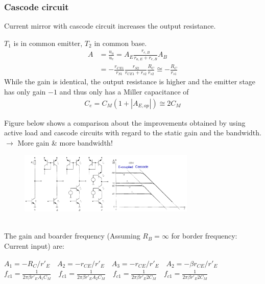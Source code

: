 		\subsubsection{Cascode circuit}
			Current mirror with cascode circuit increases the output resistance. 
			\begin{multicols}{2}
				\begin{center}
					
				\end{center}
				\vfill
				\columnbreak
				$T_1$ is in common emitter, $T_2$ in common base.
				\begin{align}
					A &= \frac{u_a}{u_e} = A_E \frac{r_{e,B}}{r_{a,E} + r_{e,B}} A_B \nonumber \\
					 &= -\frac{r_{CE1}}{r_{S1}} \frac{r_{S2}}{r_{CE1}+r_{s2}} \frac{R_C}{r_{s2}} \cong - \frac{R_C}{r_{s1}}
				\end{align}
				While the gain is identical, the output resistance is higher and the emitter stage has only gain $-1$ and thus only has a Miller capacitance of
				\begin{align}
					C_e = C_M \left( 1 + |A_{E,op}| \right) \cong 2 C_M
				\end{align}
			\end{multicols}
			
			Figure below shows a comparison about the improvements obtained by using active load and cascode circuits with regard to the static gain and the bandwidth. \\
			$\rightarrow$ More gain \& more bandwidth!
			\begin{figure}[h]
				\centering
				\includegraphics[width=0.75\textwidth]{images/Comparison.png}
				\caption{}
				\label{Fig:Comparison}
			\end{figure}\\
			The gain and boarder frequency (Assuming $R_B = \infty$ for border frequency: Current input) are:
			
			$A_1 = -R_C/r'_E \quad A_2 = -r_{CE}/r'_E \quad A_3 = -r_{CE}/r'_E \quad A_2 = -\beta r_{CE}/r'_E$\\
			$f_{c1} = \frac{1}{2 \pi \beta r'_E A_1 C_M} \quad f_{c1} = \frac{1}{2 \pi \beta r'_E A_2 C_M} \quad f_{c1} = \frac{1}{2 \pi \beta r'_E 2 C_M}\quad f_{c1} = \frac{1}{2 \pi \beta r'_E 2 C_M}$
			
